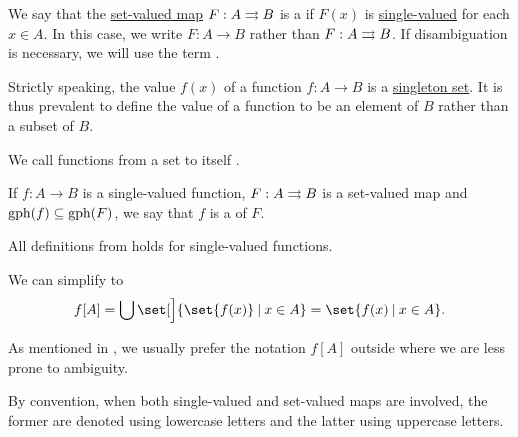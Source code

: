 \begin{definition}\label{def:function}
  We say that the \hyperref[def:function]{set-valued map} \( F: A \rightrightarrows B \) is a  if \( F(x) \) is \hyperref[def:set_valued_map/value]{single-valued} for each \( x \in A \). In this case, we write \( F: A \to B \) rather than \( F: A \rightrightarrows B \). If disambiguation is necessary, we will use the term .

  Strictly speaking, the value \( f(x) \) of a function \( f: A \to B \) is a \hyperref[def:singleton_set]{singleton set}. It is thus prevalent to define the value of a function to be an element of \( B \) rather than a subset of \( B \).

  \begin{thmenum}
     We call functions from a set to itself .

    \medskip

     If \( f: A \to B \) is a single-valued function, \( F: A \rightrightarrows B \) is a set-valued map and \( \operatorname{gph}(f) \subseteq \operatorname{gph}(F) \), we say that \( f \) is a  of \( F \).
  \end{thmenum}
\end{definition}
\begin{comments}
  \item All definitions from  holds for single-valued functions.

  \item We can simplify  to
  \begin{equation*}
    f[A]
    =
    \bigcup \set[\Big]{ \set{ f(x) } \given x \in A }
    =
    \set{ f(x) \given x \in A }.
  \end{equation*}

  As mentioned in , we usually prefer the notation \( f[A] \) outside  where we are less prone to ambiguity.

  \item By convention, when both single-valued and set-valued maps are involved, the former are denoted using lowercase letters and the latter using uppercase letters.
\end{comments}

